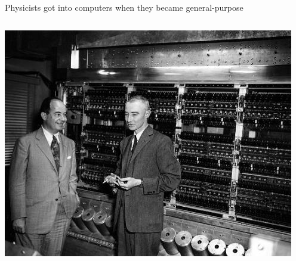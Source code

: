 \documentclass[aspectratio=169]{beamer}
\begin{document}
\begin{frame}{Physicists got into computers when they became general-purpose}
\begin{uncoverenv}
\begin{columns}
\vspace{0.25 cm}
\includegraphics[width=\linewidth]{neumann_oppie.jpg}
\end{columns}
\end{uncoverenv}
\end{frame}
\end{document}
